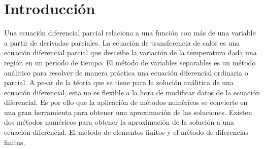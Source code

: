 \section{Introducción}

Una ecuación diferencial parcial relaciona a una función con más de una variable a partir de derivadas parciales. La ecuación de transferencia de calor es una ecuación diferencial parcial que desceibe la variación de la temperatura dada una región en un periodo de tiempo. El método de variables separables es un método análitico para resolver de manera práctica una ecuación diferencial ordinaria o parcial. A pesar de la téoria que se tiene para la solución análitica de una ecuación diferencial, esta no es flexible a la hora de modificar datos de la ecuación diferencial. Es por ello que la aplicación de métodos numéricos se convierte en una gran herramienta para obtener una aproximación de las soluciones\cite{chavarria_2019}. Existen dos métodos numéricos para obtener la aproximación de la solución a una ecuación diferencial. El método de elementos finitos y el método de diferencias finitas\cite{quintana_2016}.